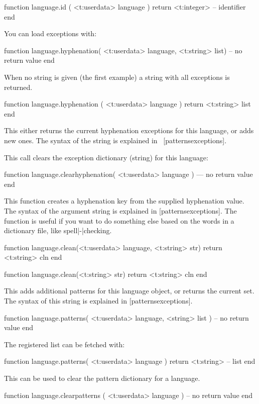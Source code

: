 \starttyping [option=LUA]
function language.id ( <t:userdata> language )
    return <t:integer> -- identifier
end
\stoptyping

You can load exceptions with:

\starttyping [option=LUA]
function language.hyphenation( <t:userdata> language, <t:string> list)
    -- no return value
end
\stoptyping

When no string is given (the first example) a string with all exceptions is
returned.

\starttyping [option=LUA]
function language.hyphenation ( <t:userdata> language )
    return <t:string> list
end
\stoptyping

This either returns the current hyphenation exceptions for this language, or adds
new ones. The syntax of the string is explained in~
[patternsexceptions].

This call clears the exception dictionary (string) for this language:

\starttyping [option=LUA]
function language.clearhyphenation( <t:userdata> language )
    --- no return value
end
\stoptyping

This function creates a hyphenation key from the supplied hyphenation value. The
syntax of the argument string is explained in  [patternsexceptions].
The function is useful if you want to do something else based on the words in a
dictionary file, like spell|-|checking.

\starttyping [option=LUA]
function language.clean(<t:userdata> language, <t:string> str)
    return <t:string> cln
end

function language.clean(<t:string> str)
    return <t:string> cln
end
\stoptyping

This adds additional patterns for this language object, or returns the current
set. The syntax of this string is explained in 
[patternsexceptions].

\starttyping [option=LUA]
function language.patterns( <t:userdata> language, <string> list )
    -- no return value
end
\stoptyping

The registered list can be fetched with:

\starttyping [option=LUA]
function language.patterns( <t:userdata> language )
    return <t:string> -- list
end
\stoptyping

This can be used to clear the pattern dictionary for a language.

\starttyping [option=LUA]
function language.clearpatterns ( <t:userdata> language )
    -- no return value
end
\stoptyping


